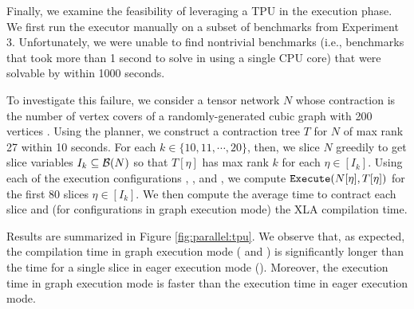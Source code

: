 Finally, we examine the feasibility of leveraging a TPU in the execution phase. We first run the  executor manually on a subset of benchmarks from Experiment 3. Unfortunately, we were unable to find nontrivial benchmarks (i.e., benchmarks that took more than 1 second to solve in  using a single CPU core) that were solvable by  within 1000 seconds.



To investigate this failure, we consider a tensor network $N$ whose contraction is the number of vertex covers of a randomly-generated cubic graph with 200 vertices \cite{KCMR18}. 
Using the  planner, we construct a contraction tree $T$ for $N$ of max rank 27 within 10 seconds. 
For each $k \in \{10, 11, \cdots, 20\}$, then, we slice $N$ greedily to get slice variables $I_k \subseteq \mathcal{B}(N)$ so that $T[\eta]$ has max rank $k$ for each $\eta \in [I_k]$. 
Using each of the execution configurations , , and , we compute $\texttt{\upshape Execute}(N[\eta], T[\eta])$ for the first 80 slices $\eta \in [I_k]$. 
We then compute the average time to contract each slice and (for configurations in graph execution mode) the XLA compilation time.

Results are summarized in Figure \ref{fig:parallel:tpu}. 
We observe that, as expected, the compilation time in graph execution mode ( and ) is significantly longer than the time for a single slice in eager execution mode (). 
Moreover, the execution time in graph execution mode is faster than the execution time in eager execution mode.

